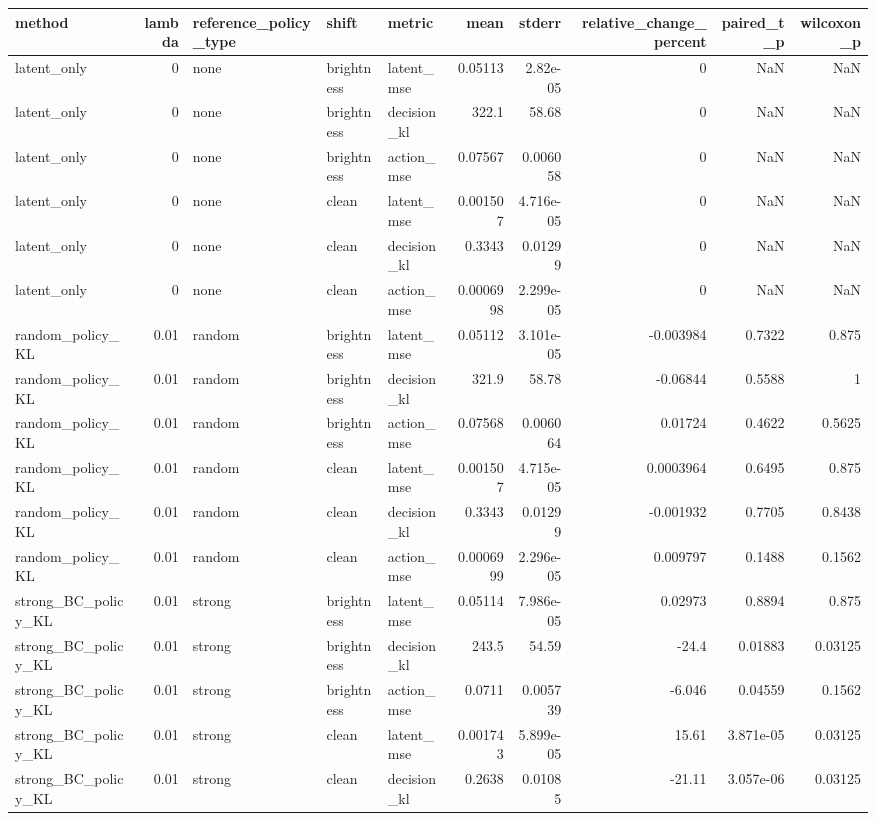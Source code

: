 \begin{tabular}{lrlllrrrrr}
\toprule
method & lambda & reference\_policy\_type & shift & metric & mean & stderr & relative\_change\_percent & paired\_t\_p & wilcoxon\_p \\
\midrule
latent\_only & 0 & none & brightness & latent\_mse & 0.05113 & 2.82e-05 & 0 & NaN & NaN \\
latent\_only & 0 & none & brightness & decision\_kl & 322.1 & 58.68 & 0 & NaN & NaN \\
latent\_only & 0 & none & brightness & action\_mse & 0.07567 & 0.006058 & 0 & NaN & NaN \\
latent\_only & 0 & none & clean & latent\_mse & 0.001507 & 4.716e-05 & 0 & NaN & NaN \\
latent\_only & 0 & none & clean & decision\_kl & 0.3343 & 0.01299 & 0 & NaN & NaN \\
latent\_only & 0 & none & clean & action\_mse & 0.0006998 & 2.299e-05 & 0 & NaN & NaN \\
random\_policy\_KL & 0.01 & random & brightness & latent\_mse & 0.05112 & 3.101e-05 & -0.003984 & 0.7322 & 0.875 \\
random\_policy\_KL & 0.01 & random & brightness & decision\_kl & 321.9 & 58.78 & -0.06844 & 0.5588 & 1 \\
random\_policy\_KL & 0.01 & random & brightness & action\_mse & 0.07568 & 0.006064 & 0.01724 & 0.4622 & 0.5625 \\
random\_policy\_KL & 0.01 & random & clean & latent\_mse & 0.001507 & 4.715e-05 & 0.0003964 & 0.6495 & 0.875 \\
random\_policy\_KL & 0.01 & random & clean & decision\_kl & 0.3343 & 0.01299 & -0.001932 & 0.7705 & 0.8438 \\
random\_policy\_KL & 0.01 & random & clean & action\_mse & 0.0006999 & 2.296e-05 & 0.009797 & 0.1488 & 0.1562 \\
strong\_BC\_policy\_KL & 0.01 & strong & brightness & latent\_mse & 0.05114 & 7.986e-05 & 0.02973 & 0.8894 & 0.875 \\
strong\_BC\_policy\_KL & 0.01 & strong & brightness & decision\_kl & 243.5 & 54.59 & -24.4 & 0.01883 & 0.03125 \\
strong\_BC\_policy\_KL & 0.01 & strong & brightness & action\_mse & 0.0711 & 0.005739 & -6.046 & 0.04559 & 0.1562 \\
strong\_BC\_policy\_KL & 0.01 & strong & clean & latent\_mse & 0.001743 & 5.899e-05 & 15.61 & 3.871e-05 & 0.03125 \\
strong\_BC\_policy\_KL & 0.01 & strong & clean & decision\_kl & 0.2638 & 0.01085 & -21.11 & 3.057e-06 & 0.03125 \\

\end{tabular}
